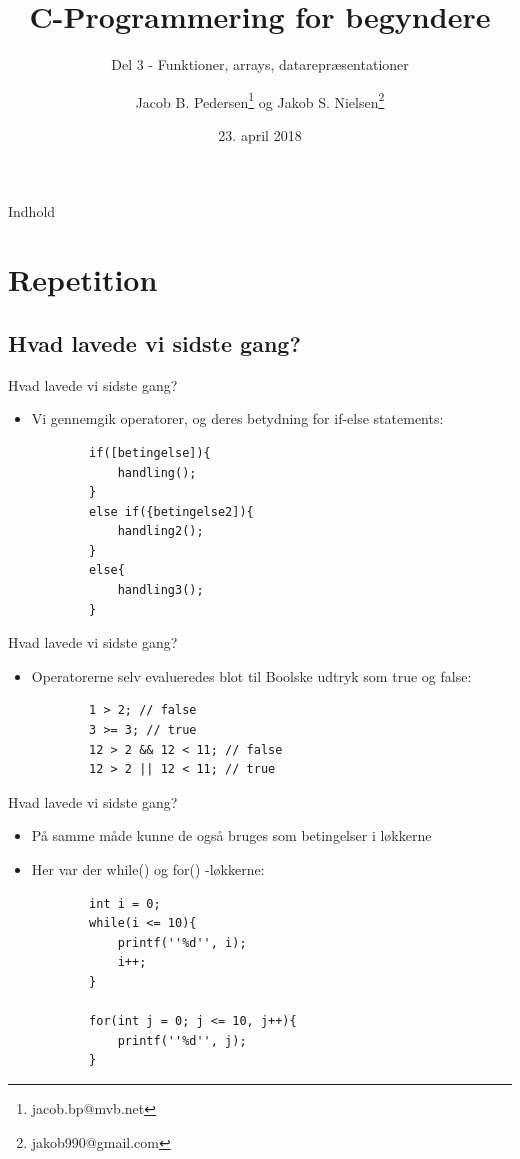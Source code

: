 \documentclass{beamer}
\title{C-Programmering for begyndere}
\date{23. april 2018}
\subtitle{Del 3 - Funktioner, arrays, datarepræsentationer}
\author{Jacob B. Pedersen\footnote{jacob.bp@mvb.net} og Jakob S. Nielsen\footnote{jakob990@gmail.com}}
\begin{document}
\begin{frame}
	\maketitle
\end{frame}

\begin{frame}{Indhold}
	\tableofcontents
\end{frame}

\section{Repetition}
\subsection{Hvad lavede vi sidste gang?}

\begin{frame}[fragile]{Hvad lavede vi sidste gang?}
	\begin{itemize}
		\item{Vi gennemgik operatorer, og deres betydning for if-else statements:}
		\begin{lstlisting}
		if([betingelse]){
			handling();
		}
		else if({betingelse2]){
			handling2();
		}
		else{
			handling3();
		}
		\end{lstlisting}
	\end{itemize}
\end{frame}


\begin{frame}[fragile]{Hvad lavede vi sidste gang?}
	\begin{itemize}
		\item{Operatorerne selv evalueredes blot til Boolske udtryk som {\color{dkgreen}true} og {\color{dkgreen}false}:}
		\begin{lstlisting}
		1 > 2; // false
		3 >= 3; // true
		12 > 2 && 12 < 11; // false
		12 > 2 || 12 < 11; // true
		\end{lstlisting}
	\end{itemize}
\end{frame}



\begin{frame}[fragile]{Hvad lavede vi sidste gang?}
	\begin{itemize}
		\item{På samme måde kunne de også bruges som betingelser i løkkerne}
		\item{Her var der {\color{C_darkblue}while}() og {\color{C_darkblue}for}() -løkkerne:}
		\begin{lstlisting}
		int i = 0;
		while(i <= 10){
			printf(''%d'', i);
			i++;
		}

		for(int j = 0; j <= 10, j++){
			printf(''%d'', j);
		}
		\end{lstlisting}
	\end{itemize}
\end{frame}
\end{document}
